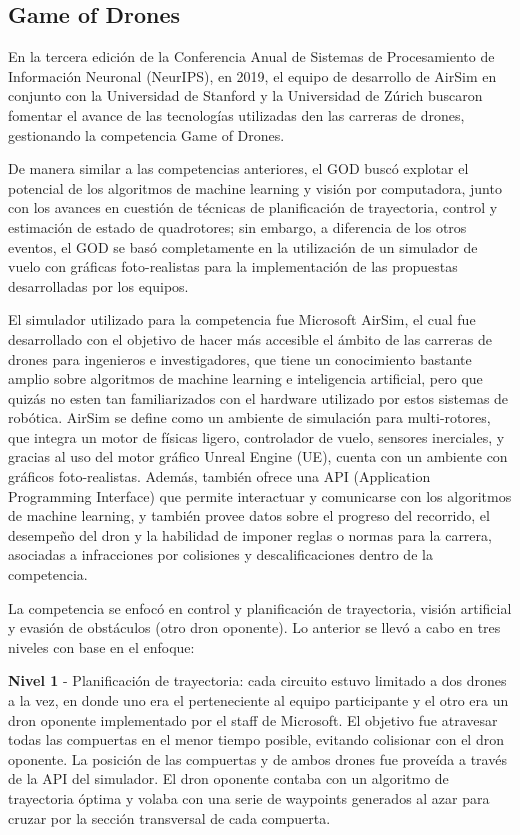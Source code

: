 \subsection{Game of Drones}
En la tercera edición de la Conferencia Anual de Sistemas de Procesamiento de Información Neuronal (NeurIPS), en 2019, el equipo de desarrollo de AirSim\cite{foehn2020alphapilot} en conjunto con la Universidad de Stanford y la Universidad de Zúrich buscaron fomentar el avance de las tecnologías utilizadas den las carreras de drones, gestionando la competencia Game of Drones.

De manera similar a las competencias anteriores, el GOD buscó explotar el potencial de los algoritmos de machine learning y visión por computadora, junto con los avances en cuestión de técnicas de planificación de trayectoria, control y estimación de estado de quadrotores; sin embargo, a diferencia de los otros eventos, el GOD se basó completamente en la utilización de un simulador de vuelo con gráficas foto-realistas para la implementación de las propuestas desarrolladas por los equipos. 

El simulador utilizado para la competencia  fue Microsoft AirSim\cite{airsim2017fsr}, el cual fue desarrollado con el objetivo de hacer más accesible el ámbito de las carreras de drones para ingenieros e investigadores, que tiene un conocimiento bastante amplio sobre algoritmos de machine learning e inteligencia artificial, pero que quizás no esten tan familiarizados con el hardware utilizado por estos sistemas de robótica. AirSim se define como un ambiente de simulación para multi-rotores, que integra un motor de físicas ligero, controlador de vuelo, sensores inerciales, y gracias al uso del motor gráfico Unreal Engine (UE), cuenta con un ambiente con gráficos foto-realistas. Además, también ofrece una API (Application Programming Interface) que permite interactuar y comunicarse con los algoritmos de machine learning, y también provee datos sobre el progreso del recorrido, el desempeño del dron y la habilidad de imponer reglas o normas para la carrera, asociadas a infracciones por colisiones y descalificaciones dentro de la competencia.

La competencia se enfocó en control y planificación de trayectoria, visión artificial y evasión de obstáculos (otro dron oponente). Lo anterior se llevó a cabo en tres niveles con base en el enfoque: 

\textbf{Nivel 1} - Planificación de trayectoria: cada circuito estuvo limitado a dos drones a la vez, en donde uno era el perteneciente al equipo participante y el otro era un dron oponente implementado por el staff de Microsoft. El objetivo fue atravesar todas las compuertas en el menor tiempo posible, evitando colisionar con el dron oponente. La posición de las compuertas y de ambos drones fue proveída a través de la API del simulador. El dron oponente contaba con un algoritmo de trayectoria óptima y volaba con una serie de waypoints generados al azar para cruzar por la sección transversal de cada compuerta.

